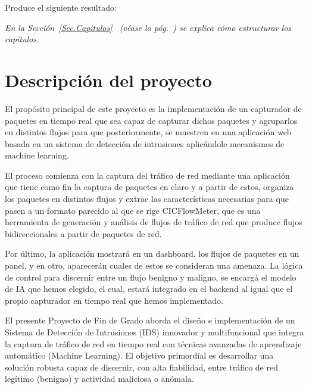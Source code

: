 Produce el siguiente resultado:

\textit{En la Sección~\ref{Sec.Capitulos}~ (véase la pág.~\pageref{Sec.Capitulos}) se explica cómo estructurar los capítulos.
}

\section{Descripción del proyecto}
El propósito principal de este proyecto es la implementación de un capturador de paquetes en tiempo real que sea capaz de capturar dichos paquetes y agruparlos en distintos flujos para que posteriormente, se muestren en una aplicación web basada en un sistema de detección de intrusiones aplicándole mecanismos de machine learning.

El proceso comienza con la captura del tráfico de red mediante una aplicación que tiene como fin la captura de paquetes en claro y a partir de estos, organiza los paquetes en distintos flujos y extrae las características necesarias para que pasen a un formato parecido al que se rige CICFlowMeter, que es una herramienta de generación y análisis de flujos de tráfico de red que produce flujos bidireccionales a partir de paquetes de red.

Por último, la aplicación mostrará en un dashboard, los flujos de paquetes en un panel, y en otro, aparecerán cuales de estos se consideran una amenaza. La lógica de control para discernir entre un flujo benigno y maligno, se encargá el modelo de IA que hemos elegido, el cual, estará integrado en el backend al igual que el propio capturador en tiempo real que hemos implementado.

El presente Proyecto de Fin de Grado aborda el diseño e implementación de un Sistema de Detección de Intrusiones (IDS) innovador y multifuncional que integra la captura de tráfico de red en tiempo real con técnicas avanzadas de aprendizaje automático (Machine Learning). El objetivo primordial es desarrollar una solución robusta capaz de discernir, con alta fiabilidad, entre tráfico de red legítimo (benigno) y actividad maliciosa o anómala.


